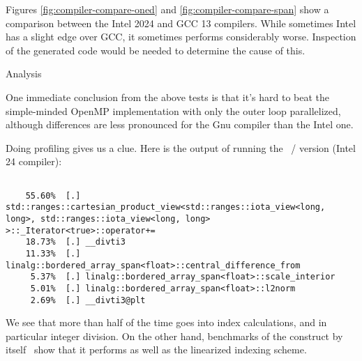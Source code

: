 \begin{figure*}[t]
  \begingroup %
  
  
  \endgroup %
  \caption{Comparing Intel to GCC on `span' (left) and `kokkos' (right) scheme}
  \label{fig:compiler-compare-span}
\end{figure*}

Figures \ref{fig:compiler-compare-oned} and \ref{fig:compiler-compare-span}
show a comparison between the Intel 2024 and GCC 13 compilers.
While sometimes Intel has a slight edge over GCC, it sometimes
performs considerably worse.
Inspection of the generated code would be needed to determine the cause of this.

 {Analysis}
\label{sec:d2d-profile}

One immediate conclusion from the above tests is that it's
hard to beat the simple-minded OpenMP implementation
with only the outer loop parallelized,
although differences are less pronounced for the Gnu compiler
than the Intel one.

Doing profiling gives us a clue.
Here is the output of running the ~/ 
version (Intel 24 compiler):
\begin{lstlisting}[language=verbatim]
%% make run_perf VARIANTS=span NSIZE=10000 ECHO=1  

    55.60%  [.] std::ranges::cartesian_product_view<std::ranges::iota_view<long, long>, std::ranges::iota_view<long, long> >::_Iterator<true>::operator+=
    18.73%  [.] __divti3
    11.33%  [.] linalg::bordered_array_span<float>::central_difference_from
     5.37%  [.] linalg::bordered_array_span<float>::scale_interior
     5.01%  [.] linalg::bordered_array_span<float>::l2norm
     2.69%  [.] __divti3@plt
\end{lstlisting}
We see that more than half of the time goes into index calculations,
and in particular integer division.
On the other hand, benchmarks of the  construct
by itself~\cite{Hollman:mdspan} show that it performs
as well as the linearized indexing scheme.

